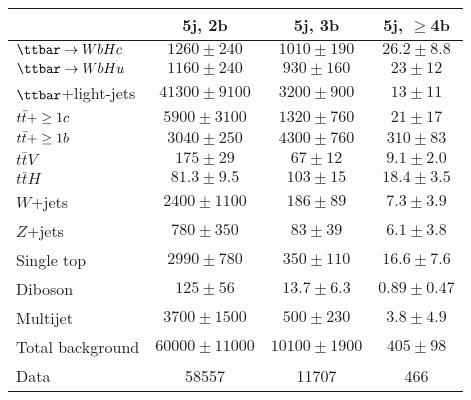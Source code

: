 \begin{table}[htbp]
\begin{center}
\begin{tabular}{l*{3}{c}}
\hline\hline
 & 5j, 2b & 5j, 3b & 5j, $\geq$4b \\
\hline
$\Hc$ & $ 1260 \pm 240 $ &   $ 1010 \pm 190 $ &   $ 26.2 \pm 8.8 $ \\ 
$\Hu$ & $ 1160 \pm 240 $ &   $ 930 \pm 160 $ &   $ 23 \pm 12 $ \\ 
\hline
$\ttbar$+light-jets & $ 41300 \pm 9100 $ &   $ 3200 \pm 900 $ &   $ 13 \pm 11 $ \\ 
$t\bar{t}+\geq1c$ & $ 5900 \pm 3100 $ &   $ 1320 \pm 760 $ &   $ 21 \pm 17 $ \\ 
$t\bar{t}+\geq1b$ & $ 3040 \pm 250 $ &   $ 4300 \pm 760 $ &   $ 310 \pm 83 $ \\ 
$t\bar{t}V$  &   $ 175 \pm 29 $ &   $ 67 \pm 12 $ &   $ 9.1 \pm 2.0 $ \\ 
$t\bar{t}H$  &   $ 81.3 \pm 9.5 $ &   $ 103 \pm 15 $ &   $ 18.4 \pm 3.5 $ \\ 
$W$+jets  &   $ 2400 \pm 1100 $ &   $ 186 \pm 89 $ &   $ 7.3 \pm 3.9 $ \\ 
$Z$+jets  &   $ 780 \pm 350 $ &   $ 83 \pm 39 $ &   $ 6.1 \pm 3.8 $ \\ 
Single top  &   $ 2990 \pm 780 $ &   $ 350 \pm 110 $ &   $ 16.6 \pm 7.6 $ \\ 
Diboson  &   $ 125 \pm 56 $ &   $ 13.7 \pm 6.3 $ &   $ 0.89 \pm 0.47 $ \\ 
Multijet  &   $ 3700 \pm 1500 $ &   $ 500 \pm 230 $ &   $ 3.8 \pm 4.9 $ \\ 
\hline
Total background &  $ 60000 \pm 11000 $ &   $ 10100 \pm 1900 $ &   $ 405 \pm 98 $ \\
\hline
Data & 58557  & 11707  & 466  \\ 
\hline\hline    
\end{tabular}
\vspace{0.2cm}


\end{center}
\end{table}
